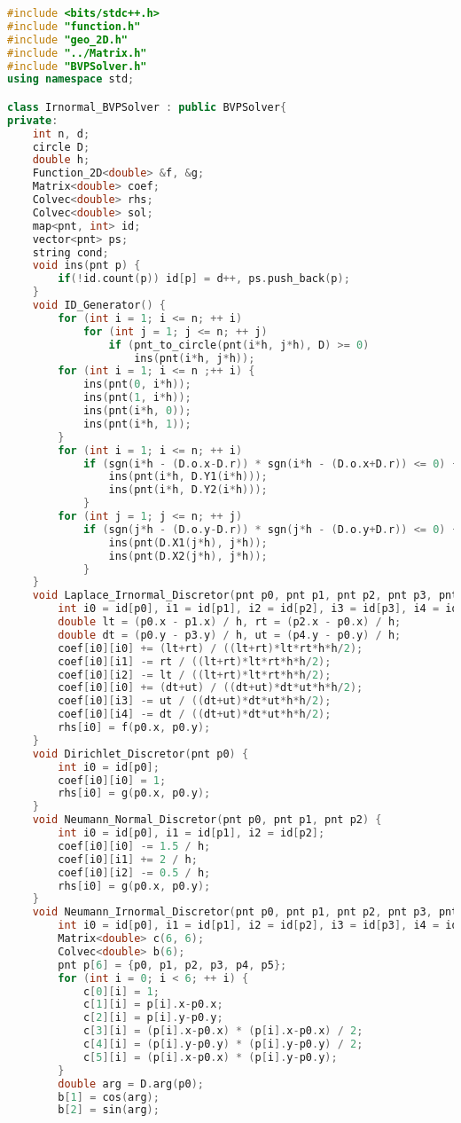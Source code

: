\documentclass{ctexart}
\begin{document}
\begin{lstlisting}[language={c++}]
#include <bits/stdc++.h>
#include "function.h"
#include "geo_2D.h"
#include "../Matrix.h"
#include "BVPSolver.h"
using namespace std;

class Irnormal_BVPSolver : public BVPSolver{
private:
	int n, d;
	circle D;
	double h;
	Function_2D<double> &f, &g;
	Matrix<double> coef;
	Colvec<double> rhs;
	Colvec<double> sol;
	map<pnt, int> id;
	vector<pnt> ps;
	string cond;
	void ins(pnt p) {
		if(!id.count(p)) id[p] = d++, ps.push_back(p);
	}
	void ID_Generator() {
		for (int i = 1; i <= n; ++ i)
			for (int j = 1; j <= n; ++ j)
				if (pnt_to_circle(pnt(i*h, j*h), D) >= 0) 
					ins(pnt(i*h, j*h));
		for (int i = 1; i <= n ;++ i) {
			ins(pnt(0, i*h));
			ins(pnt(1, i*h));
			ins(pnt(i*h, 0));
			ins(pnt(i*h, 1));
		}
		for (int i = 1; i <= n; ++ i)
			if (sgn(i*h - (D.o.x-D.r)) * sgn(i*h - (D.o.x+D.r)) <= 0) {
				ins(pnt(i*h, D.Y1(i*h)));
				ins(pnt(i*h, D.Y2(i*h)));
			}
		for (int j = 1; j <= n; ++ j)
			if (sgn(j*h - (D.o.y-D.r)) * sgn(j*h - (D.o.y+D.r)) <= 0) {
				ins(pnt(D.X1(j*h), j*h));
				ins(pnt(D.X2(j*h), j*h));
			}
	}
	void Laplace_Irnormal_Discretor(pnt p0, pnt p1, pnt p2, pnt p3, pnt p4) {
		int i0 = id[p0], i1 = id[p1], i2 = id[p2], i3 = id[p3], i4 = id[p4];
		double lt = (p0.x - p1.x) / h, rt = (p2.x - p0.x) / h;
		double dt = (p0.y - p3.y) / h, ut = (p4.y - p0.y) / h;
		coef[i0][i0] += (lt+rt) / ((lt+rt)*lt*rt*h*h/2);
		coef[i0][i1] -= rt / ((lt+rt)*lt*rt*h*h/2);
		coef[i0][i2] -= lt / ((lt+rt)*lt*rt*h*h/2);
		coef[i0][i0] += (dt+ut) / ((dt+ut)*dt*ut*h*h/2);
		coef[i0][i3] -= ut / ((dt+ut)*dt*ut*h*h/2);
		coef[i0][i4] -= dt / ((dt+ut)*dt*ut*h*h/2);
		rhs[i0] = f(p0.x, p0.y);
	}
	void Dirichlet_Discretor(pnt p0) {
		int i0 = id[p0];
		coef[i0][i0] = 1;
		rhs[i0] = g(p0.x, p0.y);
	}
	void Neumann_Normal_Discretor(pnt p0, pnt p1, pnt p2) {
		int i0 = id[p0], i1 = id[p1], i2 = id[p2];
		coef[i0][i0] -= 1.5 / h;
		coef[i0][i1] += 2 / h;
		coef[i0][i2] -= 0.5 / h;
		rhs[i0] = g(p0.x, p0.y);
	}
	void Neumann_Irnormal_Discretor(pnt p0, pnt p1, pnt p2, pnt p3, pnt p4, pnt p5) {
		int i0 = id[p0], i1 = id[p1], i2 = id[p2], i3 = id[p3], i4 = id[p4], i5 = id[p5];
		Matrix<double> c(6, 6);
		Colvec<double> b(6);
		pnt p[6] = {p0, p1, p2, p3, p4, p5};
		for (int i = 0; i < 6; ++ i) {
			c[0][i] = 1;
			c[1][i] = p[i].x-p0.x;
			c[2][i] = p[i].y-p0.y;
			c[3][i] = (p[i].x-p0.x) * (p[i].x-p0.x) / 2;
			c[4][i] = (p[i].y-p0.y) * (p[i].y-p0.y) / 2;
			c[5][i] = (p[i].x-p0.x) * (p[i].y-p0.y);
		}
		double arg = D.arg(p0);
		b[1] = cos(arg);
		b[2] = sin(arg);

\end{lstlisting}
\end{document}
